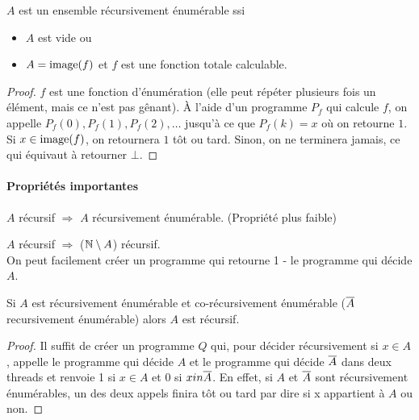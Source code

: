 \begin{myprop}
	$A$ est un ensemble récursivement énumérable ssi
    \begin{itemize}
      \item $A$ est vide ou
      \item $A = \operatorname{image}(f)$ et $f$ est une fonction totale calculable.
    \end{itemize}

    \begin{proof}
      $f$ est une fonction d'énumération (elle peut répéter plusieurs fois un élément, mais ce n'est pas gênant).
      À l'aide d'un programme $P_f$ qui calcule $f$,
      on appelle $P_f(0), P_f(1), P_f(2), \ldots$
      jusqu'à ce que $P_f(k) = x$ où on retourne $1$.
      Si $x \in \operatorname{image}(f)$, on retournera $1$ tôt ou tard.
      Sinon, on ne terminera jamais, ce qui équivaut à retourner $\bot$.
    \end{proof}
\end{myprop}


\paragraph{Propriétés importantes}
\label{par:propri_t_s_importantes}
\begin{myprop}
	$A$ récursif $\Rightarrow$ $A$ récursivement énumérable. (Propriété plus
		faible)
\end{myprop}

\begin{myprop}
	$A$ récursif $\Rightarrow$ ($\mathbb{N} \setminus A$) récursif.\\ On peut facilement créer
		un programme qui retourne 1 - le programme qui décide $A$.
\end{myprop}

\begin{myprop}
    Si $A$ est récursivement énumérable et co-récursivement énumérable ($\overline{A}$ recursivement énumérable)
    alors $A$ est récursif.
    \begin{proof}
      Il suffit de créer un programme $Q$ qui, pour décider récursivement si $x \in A$, appelle le programme qui décide $A$ et le programme qui décide $\overline{A}$ dans deux threads et renvoie 1 si $x \in A$ et 0 si $x in \overline{A}$. En effet, si $A$ et $\overline{A}$ sont récursivement énumérables, un des deux appels finira tôt ou tard par dire si x appartient à $A$ ou non.
    \end{proof}
\end{myprop}

